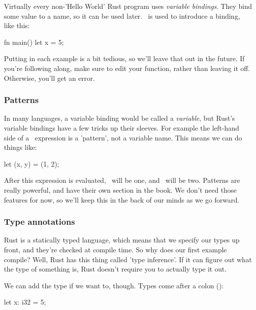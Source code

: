 Virtually every non-'Hello World' Rust program uses \emph{variable bindings}. They bind some value to a name, so it can be used 
later. \keylet\ is used to introduce a binding, like this:

\begin{rustc}
fn main() {
    let x = 5;
}
\end{rustc}

Putting  in each example is a bit tedious, so we'll leave that out in the future. If you're following along, 
make sure to edit your  function, rather than leaving it off. Otherwise, you'll get an error.

\subsubsection*{Patterns}

In many languages, a variable binding would be called a \emph{variable}, but Rust's variable bindings have a few tricks up 
their sleeves. For example the left-hand side of a \keylet\ expression is a 'pattern', not a variable name. This means we can 
do things like:

\begin{rustc}
let (x, y) = (1, 2);
\end{rustc}

After this expression is evaluated, \x\ will be one, and \y\ will be two. Patterns are really powerful, and have their 
own section in the book. We don't need those features for now, so we'll keep this in the back of our minds as we go forward.

\subsubsection*{Type annotations}

Rust is a statically typed language, which means that we specify our types up front, and they're checked at compile time. So why 
does our first example compile? Well, Rust has this thing called 'type inference'. If it can figure out what the type of something
is, Rust doesn't require you to actually type it out.

\blank

We can add the type if we want to, though. Types come after a colon (\code{:}):

\begin{rustc}
let x: i32 = 5;
\end{rustc}

